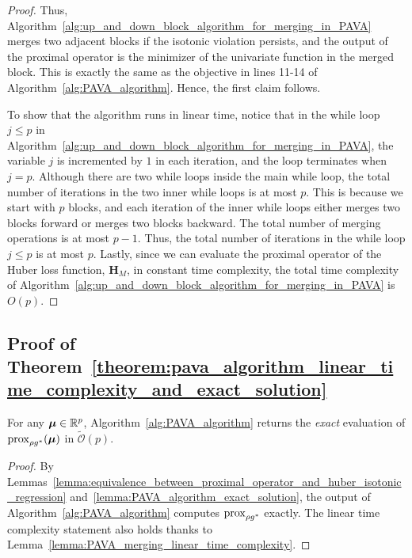 \begin{proof}
Thus, Algorithm~\ref{alg:up_and_down_block_algorithm_for_merging_in_PAVA} merges two adjacent blocks if the isotonic violation persists, and the output of the proximal operator is the minimizer of the univariate function in the merged block.
This is exactly the same as the objective in lines 11-14 of Algorithm~\ref{alg:PAVA_algorithm}. Hence, the first claim follows.

To show that the algorithm runs in linear time, notice that in the while loop $j \leq p$ in Algorithm~\ref{alg:up_and_down_block_algorithm_for_merging_in_PAVA}, the variable $j$ is incremented by $1$ in each iteration, and the loop terminates when $j = p$.
Although there are two while loops inside the main while loop, the total number of iterations in the two inner while loops is at most $p$.
This is because we start with $p$ blocks, and each iteration of the inner while loops either merges two blocks forward or merges two blocks backward.
The total number of merging operations is at most $p-1$.
Thus, the total number of iterations in the while loop $j \leq p$ is at most $p$.
Lastly, since we can evaluate the proximal operator of the Huber loss function, $\mathbf{H}_M$, in constant time complexity, the total time complexity of Algorithm~\ref{alg:up_and_down_block_algorithm_for_merging_in_PAVA} is $O(p)$.
\end{proof}

\subsection{Proof of Theorem~\ref{theorem:pava_algorithm_linear_time_complexity_and_exact_solution}}

\begin{namedtheorem}
    [~\ref{theorem:pava_algorithm_linear_time_complexity_and_exact_solution}]
    For any $\bm{\mu} \in \mathbb{R}^p$, Algorithm~\ref{alg:PAVA_algorithm} returns the \textit{exact} evaluation of $\operatorname{prox}_{\rho g^*}(\bm{\mu})$ in $\tilde {\mathcal O}(p)$.
\end{namedtheorem}

\begin{proof}
    By Lemmas~\ref{lemma:equivalence_between_proximal_operator_and_huber_isotonic_regression} and~\ref{lemma:PAVA_algorithm_exact_solution}, the output of Algorithm~\ref{alg:PAVA_algorithm} computes $\operatorname{prox}_{\rho g^*}$ exactly. 
    The linear time complexity statement also holds thanks to Lemma~\ref{lemma:PAVA_merging_linear_time_complexity}.
\end{proof}

